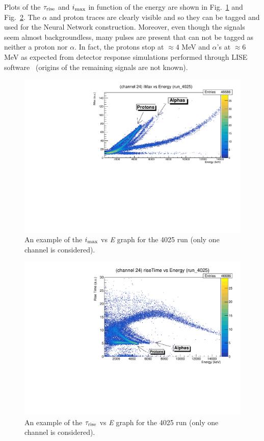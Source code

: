 \bigbreak

Plots of the $\tau _{\textup{rise}}$ and $i_{\textup{max}}$ in function of the energy
are shown in Fig.~\ref{imax} and Fig.~\ref{risetime}. The $\alpha$ and proton
traces are clearly visible and so they can be tagged and used for the
Neural Network construction. Moreover, even though the signals seem almost
backgroundless, many pulses are present that can not be tagged as neither a
proton nor $\alpha$. In fact, the protons stop at $\approx 4$ MeV and
$\alpha$'s at $\approx 6$ MeV as expected from detector response simulations
performed through LISE software~\cite{lise} (origins of the remaining signals
are not known).

\begin{figure}[h]
  \centering
  \includegraphics[scale=.6]{img/iMax_4025.pdf}
  \caption{An example of the $i_{\textup{max}}$ vs \textit{E} graph for the 4025 run (only one channel is considered).}
  \label{imax}
\end{figure}

\begin{figure}[h]
  \centering
  \includegraphics[scale=.6]{img/riseTime_4025.pdf}
  \caption{An example of the $\tau _{\textup{rise}}$ vs \textit{E} graph for the 4025 run (only one channel is considered).}
  \label{risetime}
\end{figure}

\clearpage